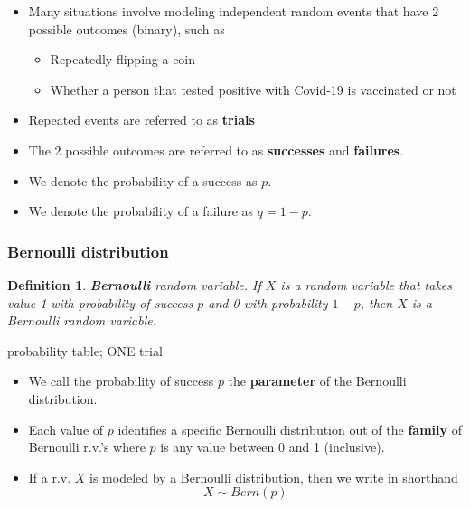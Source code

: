 \documentclass[12pt]{amsart}
\newtheorem{definition}[theorem]{Definition}
\begin{document}
{\begin{itemize}
\item Many situations involve modeling independent random events that have 2 possible outcomes (binary), such as
	\begin{itemize}
	\item Repeatedly flipping a coin
	\item Whether a person that tested positive with Covid-19 is vaccinated or not
	\end{itemize}
\item Repeated events are referred to as \textbf{trials}
\item The 2 possible outcomes are referred to as \textbf{successes} and \textbf{failures}.
\item We denote the probability of a success as $p$. 
\item We denote the probability of a failure as $q = 1-p$. 
\end{itemize}


\subsubsection{Bernoulli distribution}



\begin{definition}{\textbf{Bernoulli} random variable.} \newline
If $X$ is a random variable that takes value 1 with probability of success $p$ and 0 with probability $1-p$, then $X$ is a Bernoulli random variable. 
\end{definition}
\color{blue}
probability table; ONE trial
\color{black}

\begin{itemize}
\item We call the probability of success $p$ the \textbf{parameter} of the Bernoulli distribution. 
\item Each value of $p$ identifies a specific Bernoulli distribution out of the \textbf{family} of Bernoulli r.v.'s where $p$ is any value between 0 and 1 (inclusive). 
\item If a r.v. $X$ is modeled by a Bernoulli distribution, then we write in shorthand
\color{blue}
$$X\sim Bern(p)$$
\color{black}
\end{itemize}

}
\end{document}
